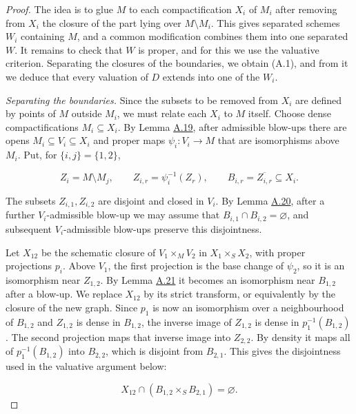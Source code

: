 \documentclass[11pt]{article}
\begin{document}
\begin{proof}[{Proof}]\label{bp64}%
The idea is to glue \(M\) to each compactification \(X_i\) of \(M_i\) after removing from \(X_i\) the closure of the part lying over \(M\setminus M_i\). This gives separated schemes \(W_i\) containing \(M\), and a common modification combines them into one separated \(W\). It remains to check that \(W\) is proper, and for this we use the valuative criterion. Separating the closures of the boundaries, we obtain (A.1), and from it we deduce that every valuation of \(D\) extends into one of the \(W_i\).

\emph{Separating the boundaries.} Since the subsets to be removed from \(X_i\) are defined by points of \(M\) outside \(M_i\), we must relate each \(X_i\) to \(M\) itself. Choose dense compactifications \(M_i\subseteq X_i\). By Lemma \hyperref[bp51]{A.19}, after admissible blow-ups there are opens \(M_i\subseteq V_i\subseteq X_i\) and proper maps \(\psi_i:V_i\to M\) that are isomorphisms above \(M_i\). Put, for \(\{i,j\}=\{1,2\}\),

\[
Z_i=M\setminus M_j,\qquad
Z_{i,r}=\psi_i^{-1}(Z_r),\qquad
B_{i,r}=\overline{Z_{i,r}}\subseteq X_i.
\]

The subsets \(Z_{i,1},Z_{i,2}\) are disjoint and closed in \(V_i\). By Lemma \hyperref[bp55]{A.20}, after a further \(V_i\)-admissible blow-up we may assume that \(B_{i,1}\cap B_{i,2}=\varnothing\), and subsequent \(V_i\)-admissible blow-ups preserve this disjointness.

Let \(X_{12}\) be the schematic closure of \(V_1\times_MV_2\) in \(X_1\times_SX_2\), with proper projections \(p_i\). Above \(V_1\), the first projection is the base change of \(\psi_2\), so it is an isomorphism near \(Z_{1,2}\). By Lemma \hyperref[bp57]{A.21} it becomes an isomorphism near \(B_{1,2}\) after a blow-up. We replace \(X_{12}\) by its strict transform, or equivalently by the closure of the new graph. Since \(p_1\) is now an isomorphism over a neighbourhood of \(B_{1,2}\) and \(Z_{1,2}\) is dense in \(B_{1,2}\), the inverse image of \(Z_{1,2}\) is dense in \(p_1^{-1}(B_{1,2})\). The second projection maps that inverse image into \(Z_{2,2}\). By density it maps all of \(p_1^{-1}(B_{1,2})\) into \(B_{2,2}\), which is disjoint from \(B_{2,1}\). This gives the disjointness used in the valuative argument below:

\[
X_{12}\cap(B_{1,2}\times_SB_{2,1})=\varnothing.
\tag{A.1}
\]


\end{proof}
\end{document}
